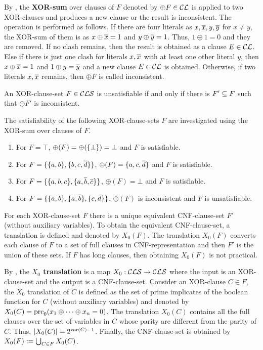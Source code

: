 \documentclass{report}
\begin{document}
\begin{defi}\label{def:xor-sum}
By \cite{GwynneKullmann2013GoodRepresentationsIIex}, the \textbf{XOR-sum} over clauses of $F$ denoted by $\oplus F \in \mathcal{CL}$ is applied to two XOR-clauses and produces a new clause or the result is inconsistent. The operation is performed as follows. If there are four literals as $x,\overline{x},y,\overline{y}$ for $x \ne y$, the XOR-sum of them is as $x \oplus \overline{x} = 1$ and $y \oplus \overline{y} = 1$. Thus, $1 \oplus 1 = 0$ and they are removed. If no clash remains, then the result is obtained as a clause $E \in \mathcal{CL}$. Else if there is just one clash for literals $x, \overline{x}$ with at least one other literal $y$, then $x \oplus \overline{x} = 1$ and $1 \oplus y=\overline{y}$ and a new clause $E \in \mathcal{CL}$ is obtained. Otherwise, if two literals $x, \overline{x}$ remains, then $\oplus F$ is called inconsistent. 

An XOR-clause-set $F \in \mathcal{CLS}$ is unsatisfiable if and only if there is $F' \subseteq F$ such that $\oplus F'$ is inconsistent.
\end{defi} 

\begin{examp}\label{exp:xorcls}
The satisfiability of the following XOR-clause-sets $F$ are investigated using the XOR-sum over clauses of $F$.
  \begin{enumerate}
  \item For $F=\top$, $ \oplus(F)= \oplus(\{ \bot \})=\bot$ and $F$ is satisfiable.
  \item For $F=\{ \{ a,b \},\{ b,c,\overline d \} \}$, $ \oplus(F) = \{ a,c,\overline d \}$ and $F$ is satisfiable.
  \item For $F=\{ \{ a,b,c \},\{ a, \overline b, \overline c \} \}$, $ \oplus(F) = \bot$ and $F$ is satisfiable.  
  \item  For $F=\{ \{ a,b \},\{ a, \overline b \},\{ c,d \} \}$, $\oplus (F)$ is inconsistent and $F$ is unsatisfiable.
  \end{enumerate}
\end{examp}

For each XOR-clause-set $F$ there is a unique equivalent CNF-clause-set $F'$ (without auxiliary variables). To obtain the equivalent CNF-clause-set, a translation is defined and denoted by $X_0(F)$. The translation $X_0(F)$ converts each clause of $F$ to a set of full clauses in CNF-representation and then $F'$ is the union of these sets. If $F$ has long clauses, then obtaining $X_0(F)$ is not practical.

\begin{defi}\label{def:x0tr}
By \cite{GwynneKullmann2013GoodRepresentationsIIex}, the \textbf{$X_0$ translation} is a map $X_0: \mathcal{CLS} \rightarrow \mathcal{CLS}$ where the input is an XOR-clause-set and the output is a  CNF-clause-set. Consider an XOR-clause $C \in F$, the $X_0$ translation of $C$ is defined as the set of prime implicates of the boolean function for $C$ (without auxiliary variables) and denoted by $X_0(C)=\operatorname{prc}_0(x_1 \oplus \dots \oplus x_n = 0)$. The translation $X_0(C)$ contains all the full clauses over the set of variables in $C$ whose parity are different from the parity of $C$. Thus, $\lvert X_0(C) \rvert=2^{\operatorname{var}(C)-1}$. Finally, the CNF-clause-set is obtained by $X_0(F) := \bigcup_{C \in F} X_0(C)$.
\end{defi} 
\end{document}
